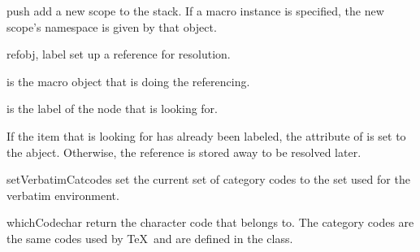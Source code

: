 \begin{methoddesc}[Context]{push}{}
add a new scope to the stack.  If a macro instance  is specified, 
the new scope's namespace is given by that object.
\end{methoddesc}

\begin{methoddesc}[Context]{ref}{obj, label}
set up a reference for resolution.  

 is the macro object that is doing the referencing.

 is the label of the node that  is looking for.

If the item that  is looking for has already been labeled, 
the  attribute of  is set to the abject.  
Otherwise, the reference is stored away to be resolved later. 
\end{methoddesc}

\begin{methoddesc}[Context]{setVerbatimCatcodes}{}
set the current set of category codes to the set used for the verbatim
environment.
\end{methoddesc}

\begin{methoddesc}[Context]{whichCode}{char}
return the character code that  belongs to.  The category
codes are the same codes used by \TeX\ and are defined in the 
 class.  
\end{methoddesc}


